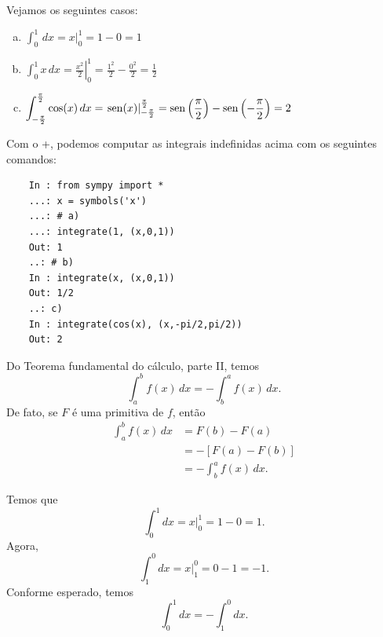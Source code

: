 \begin{ex}
  Vejamos os seguintes casos:
  \begin{enumerate}[a)]
  \item $\displaystyle \int_0^1 \,dx = \left. x \right|_0^1 = 1 - 0 = 1$
  \item $\displaystyle \int_0^1 x\,dx = \left.\frac{x^2}{2}\right|_0^1 = \frac{1^2}{2}-\frac{0^2}{2} = \frac{1}{2}$
  \item $\displaystyle \int_{-\frac{\pi}{2}}^{\frac{\pi}{2}} \cos(x)\,dx = \left.\operatorname{sen}(x)\right|_{-\frac{\pi}{2}}^{\frac{\pi}{2}} = \operatorname{sen}\left(\frac{\pi}{2}\right) - \operatorname{sen}\left(-\frac{\pi}{2}\right) = 2$
  \end{enumerate}
  \ifispython
  Com o {\python}+{\sympy}, podemos computar as integrais indefinidas acima com os seguintes comandos:
  \begin{lstlisting}
    In : from sympy import *
    ...: x = symbols('x')
    ...: # a)
    ...: integrate(1, (x,0,1))
    Out: 1
    ..: # b)
    In : integrate(x, (x,0,1))
    Out: 1/2
    ..: c)
    In : integrate(cos(x), (x,-pi/2,pi/2))
    Out: 2
  \end{lstlisting}
  \fi  
\end{ex}

\begin{obs}
  Do Teorema fundamental do cálculo, parte II, temos
  \begin{equation}
    \int_a^b f(x)\,dx = - \int_b^a f(x)\,dx.
  \end{equation}
  De fato, se $F$ é uma primitiva de $f$, então
  \begin{align}
    \int_a^b f(x)\,dx &= F(b) - F(a) \\
                      &= - \left[F(a) - F(b)\right] \\
                      &= - \int_b^a f(x)\,dx.
  \end{align}
\end{obs}

\begin{ex}
  Temos que
  \begin{equation}
    \int_0^1 dx = \left. x\right|_0^1 = 1 - 0 = 1.
  \end{equation}
  Agora,
  \begin{equation}
    \int_1^0 dx = \left. x\right|_1^0 = 0 - 1 = -1.
  \end{equation}
  Conforme esperado, temos
  \begin{equation}
    \int_0^1 dx = - \int_1^0 dx.
  \end{equation}
\end{ex}


